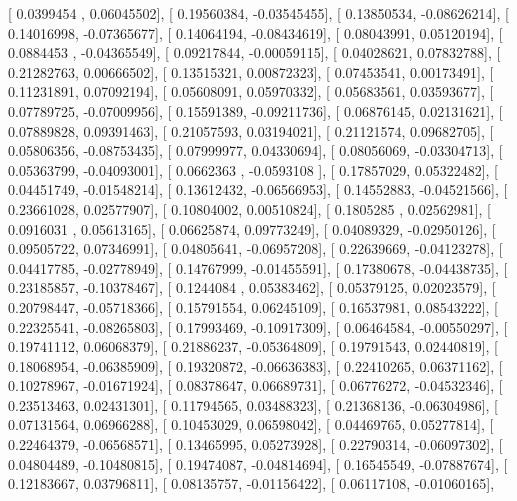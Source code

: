 \documentclass{article}
\begin{document}
       [ 0.0399454 ,  0.06045502],
       [ 0.19560384, -0.03545455],
       [ 0.13850534, -0.08626214],
       [ 0.14016998, -0.07365677],
       [ 0.14064194, -0.08434619],
       [ 0.08043991,  0.05120194],
       [ 0.0884453 , -0.04365549],
       [ 0.09217844, -0.00059115],
       [ 0.04028621,  0.07832788],
       [ 0.21282763,  0.00666502],
       [ 0.13515321,  0.00872323],
       [ 0.07453541,  0.00173491],
       [ 0.11231891,  0.07092194],
       [ 0.05608091,  0.05970332],
       [ 0.05683561,  0.03593677],
       [ 0.07789725, -0.07009956],
       [ 0.15591389, -0.09211736],
       [ 0.06876145,  0.02131621],
       [ 0.07889828,  0.09391463],
       [ 0.21057593,  0.03194021],
       [ 0.21121574,  0.09682705],
       [ 0.05806356, -0.08753435],
       [ 0.07999977,  0.04330694],
       [ 0.08056069, -0.03304713],
       [ 0.05363799, -0.04093001],
       [ 0.0662363 , -0.0593108 ],
       [ 0.17857029,  0.05322482],
       [ 0.04451749, -0.01548214],
       [ 0.13612432, -0.06566953],
       [ 0.14552883, -0.04521566],
       [ 0.23661028,  0.02577907],
       [ 0.10804002,  0.00510824],
       [ 0.1805285 ,  0.02562981],
       [ 0.0916031 ,  0.05613165],
       [ 0.06625874,  0.09773249],
       [ 0.04089329, -0.02950126],
       [ 0.09505722,  0.07346991],
       [ 0.04805641, -0.06957208],
       [ 0.22639669, -0.04123278],
       [ 0.04417785, -0.02778949],
       [ 0.14767999, -0.01455591],
       [ 0.17380678, -0.04438735],
       [ 0.23185857, -0.10378467],
       [ 0.1244084 ,  0.05383462],
       [ 0.05379125,  0.02023579],
       [ 0.20798447, -0.05718366],
       [ 0.15791554,  0.06245109],
       [ 0.16537981,  0.08543222],
       [ 0.22325541, -0.08265803],
       [ 0.17993469, -0.10917309],
       [ 0.06464584, -0.00550297],
       [ 0.19741112,  0.06068379],
       [ 0.21886237, -0.05364809],
       [ 0.19791543,  0.02440819],
       [ 0.18068954, -0.06385909],
       [ 0.19320872, -0.06636383],
       [ 0.22410265,  0.06371162],
       [ 0.10278967, -0.01671924],
       [ 0.08378647,  0.06689731],
       [ 0.06776272, -0.04532346],
       [ 0.23513463,  0.02431301],
       [ 0.11794565,  0.03488323],
       [ 0.21368136, -0.06304986],
       [ 0.07131564,  0.06966288],
       [ 0.10453029,  0.06598042],
       [ 0.04469765,  0.05277814],
       [ 0.22464379, -0.06568571],
       [ 0.13465995,  0.05273928],
       [ 0.22790314, -0.06097302],
       [ 0.04804489, -0.10480815],
       [ 0.19474087, -0.04814694],
       [ 0.16545549, -0.07887674],
       [ 0.12183667,  0.03796811],
       [ 0.08135757, -0.01156422],
       [ 0.06117108, -0.01060165],
\end{document}
